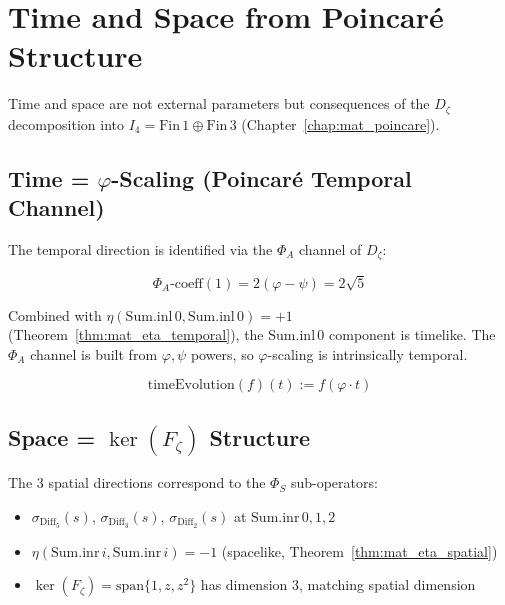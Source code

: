 \chapter{Time and Space from Poincar\'{e} Structure}
\label{chap:mat_time_space}

Time and space are not external parameters but consequences of the $D_\zeta$ decomposition into $I_4 = \mathrm{Fin}\,1 \oplus \mathrm{Fin}\,3$ (Chapter~\ref{chap:mat_poincare}).

\section{Time = \texorpdfstring{$\varphi$}{φ}-Scaling (Poincar\'{e} Temporal Channel)}
\label{sec:mat_time_definition}

The temporal direction is identified via the $\Phi_A$ channel of $D_\zeta$:

\begin{theorem}[$\Phi_A$-Coefficient at $s=1$]
\label{thm:mat_phiA_one}
\leanok
\[
\Phi_A\text{-coeff}(1) = 2(\varphi - \psi) = 2\sqrt{5}
\]
\end{theorem}

Combined with $\eta(\mathrm{Sum.inl}\,0, \mathrm{Sum.inl}\,0) = +1$ (Theorem~\ref{thm:mat_eta_temporal}), the $\mathrm{Sum.inl}\,0$ component is timelike. The $\Phi_A$ channel is built from $\varphi, \psi$ powers, so $\varphi$-scaling is intrinsically temporal.

\begin{definition}
\label{def:mat_time_evolution}
\leanok
\[
\mathrm{timeEvolution}(f)(t) := f(\varphi \cdot t)
\]
\end{definition}

\section{Space = \texorpdfstring{$\ker(F_\zeta)$}{ker(Fζ)} Structure}
\label{sec:mat_space_definition}

The 3 spatial directions correspond to the $\Phi_S$ sub-operators:

\begin{itemize}
\item $\sigma_{\mathrm{Diff}_5}(s)$, $\sigma_{\mathrm{Diff}_3}(s)$, $\sigma_{\mathrm{Diff}_2}(s)$ at $\mathrm{Sum.inr}\,0,1,2$
\item $\eta(\mathrm{Sum.inr}\,i, \mathrm{Sum.inr}\,i) = -1$ (spacelike, Theorem~\ref{thm:mat_eta_spatial})
\item $\ker(F_\zeta) = \mathrm{span}\{1, z, z^2\}$ has dimension 3, matching spatial dimension
\end{itemize}

